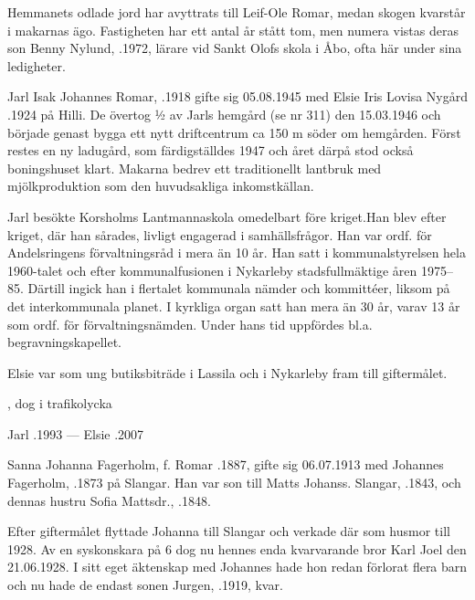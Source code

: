 Hemmanets odlade jord har avyttrats till Leif-Ole Romar, medan skogen kvarstår i makarnas ägo. Fastigheten har ett antal år stått tom, men numera vistas deras son Benny Nylund, .1972, lärare vid Sankt Olofs skola i  Åbo, ofta här under sina ledigheter.


Jarl Isak Johannes Romar, .1918 gifte sig 05.08.1945 med Elsie Iris Lovisa Nygård .1924 på Hilli. De övertog ½ av Jarls hemgård (se nr 311) den 15.03.1946 och började genast bygga ett nytt driftcentrum ca 150 m söder om hemgården. Först restes en ny ladugård, som färdigställdes 1947 och året därpå stod också boningshuset klart. Makarna bedrev ett traditionellt lantbruk med mjölkproduktion som den huvudsakliga inkomstkällan.

Jarl besökte Korsholms Lantmannaskola omedelbart före kriget.Han blev efter kriget, där han sårades, livligt engagerad i samhällsfrågor. Han var ordf. för Andelsringens förvaltningsråd i mera än 10 år. Han satt i kommunalstyrelsen hela 1960-talet och efter kommunalfusionen i Nykarleby stadsfullmäktige åren 1975--85. Därtill ingick han i flertalet kommunala nämder och kommittéer, liksom på det interkommunala planet. I kyrkliga organ satt han mera än 30 år, varav 13 år som ordf. för förvaltningsnämden. Under hans tid uppfördes bl.a. begravningskapellet.

Elsie var som ung butiksbiträde i Lassila och i Nykarleby fram till giftermålet.
\begin{jhchildren}
  \item {}
  \item {}, dog i trafikolycka
\end{jhchildren}

Jarl .1993  ---  Elsie .2007




Sanna Johanna Fagerholm, f. Romar .1887, gifte sig 06.07.1913 med Johannes Fagerholm, .1873 på Slangar. Han var son till Matts Johanss. Slangar, .1843, och dennas hustru Sofia Mattsdr., .1848.

Efter giftermålet flyttade Johanna till Slangar och verkade där som husmor till 1928. Av en syskonskara på 6 dog nu hennes enda kvarvarande bror Karl Joel den 21.06.1928. I sitt eget äktenskap med Johannes hade hon redan förlorat flera barn och nu hade de endast sonen Jurgen, .1919, kvar.

